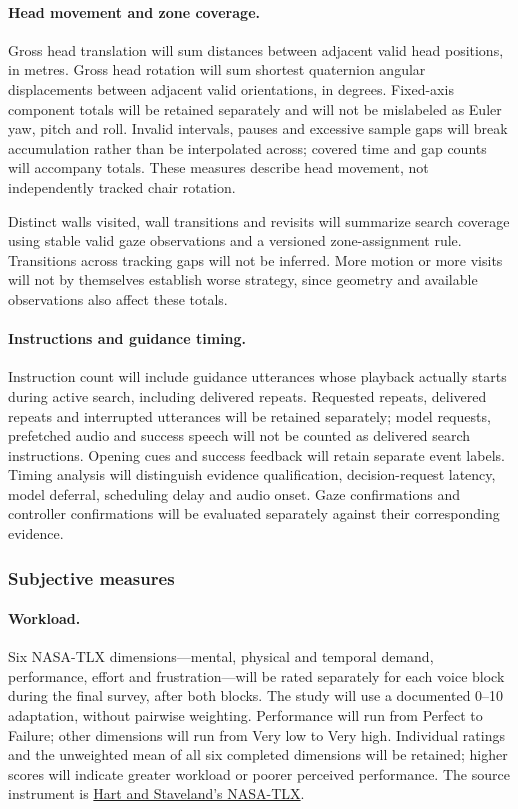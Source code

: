 \documentclass[11pt,letterpaper]{article}
\begin{document}
\paragraph{Head movement and zone coverage.} Gross head translation will sum distances between adjacent valid head positions, in metres. Gross head rotation will sum shortest quaternion angular displacements between adjacent valid orientations, in degrees. Fixed-axis component totals will be retained separately and will not be mislabeled as Euler yaw, pitch and roll. Invalid intervals, pauses and excessive sample gaps will break accumulation rather than be interpolated across; covered time and gap counts will accompany totals. These measures describe head movement, not independently tracked chair rotation.

Distinct walls visited, wall transitions and revisits will summarize search coverage using stable valid gaze observations and a versioned zone-assignment rule. Transitions across tracking gaps will not be inferred. More motion or more visits will not by themselves establish worse strategy, since geometry and available observations also affect these totals.

\paragraph{Instructions and guidance timing.} Instruction count will include guidance utterances whose playback actually starts during active search, including delivered repeats. Requested repeats, delivered repeats and interrupted utterances will be retained separately; model requests, prefetched audio and success speech will not be counted as delivered search instructions. Opening cues and success feedback will retain separate event labels. Timing analysis will distinguish evidence qualification, decision-request latency, model deferral, scheduling delay and audio onset. Gaze confirmations and controller confirmations will be evaluated separately against their corresponding evidence.

\subsubsection{Subjective measures}
\paragraph{Workload.} Six NASA-TLX dimensions---mental, physical and temporal demand, performance, effort and frustration---will be rated separately for each voice block during the final survey, after both blocks. The study will use a documented 0--10 adaptation, without pairwise weighting. Performance will run from Perfect to Failure; other dimensions will run from Very low to Very high. Individual ratings and the unweighted mean of all six completed dimensions will be retained; higher scores will indicate greater workload or poorer perceived performance. The source instrument is \href{https://doi.org/10.1016/S0166-4115(08)62386-9}{Hart and Staveland's NASA-TLX}.
\end{document}
